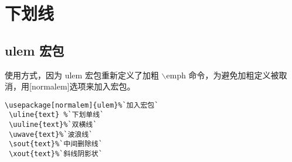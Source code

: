 \section{下划线}
\subsection{ulem 宏包}

使用方式，因为 ulem 宏包重新定义了加粗 $\backslash$emph
命令，为避免加粗定义被取消，用[normalem]选项来加入宏包。
\begin{lstlisting}[language={[LaTeX]TeX}]
 \usepackage[normalem]{ulem}%`加入宏包`
 \uline{text} %`下划单线`
 \uuline{text}%`双横线`
 \uwave{text}%`波浪线`
 \sout{text}%`中间删除线`
 \xout{text}%`斜线阴影状`
\end{lstlisting}


